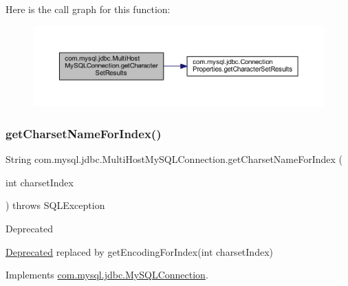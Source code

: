 Here is the call graph for this function\+:
\nopagebreak
\begin{figure}[H]
\begin{center}
\leavevmode
\includegraphics[width=350pt]{classcom_1_1mysql_1_1jdbc_1_1_multi_host_my_s_q_l_connection_aaca38e46c6210e8784c710b30740e820_cgraph}
\end{center}
\end{figure}
\mbox{\label{classcom_1_1mysql_1_1jdbc_1_1_multi_host_my_s_q_l_connection_a1f8af47fc87288b476e1fb532efecda0}} 
\subsubsection{\texorpdfstring{get\+Charset\+Name\+For\+Index()}{getCharsetNameForIndex()}}
{\footnotesize\ttfamily String com.\+mysql.\+jdbc.\+Multi\+Host\+My\+S\+Q\+L\+Connection.\+get\+Charset\+Name\+For\+Index (\begin{DoxyParamCaption}\item[{int}]{charset\+Index }\end{DoxyParamCaption}) throws S\+Q\+L\+Exception}

\begin{DoxyRefDesc}{Deprecated}
\item[\mbox{\hyperlink{deprecated__deprecated000012}{Deprecated}}]replaced by {\ttfamily get\+Encoding\+For\+Index(int charset\+Index)} \end{DoxyRefDesc}


Implements \mbox{\hyperlink{interfacecom_1_1mysql_1_1jdbc_1_1_my_s_q_l_connection_a22f366874501fa1c71054ad89fc56b32}{com.\+mysql.\+jdbc.\+My\+S\+Q\+L\+Connection}}.

